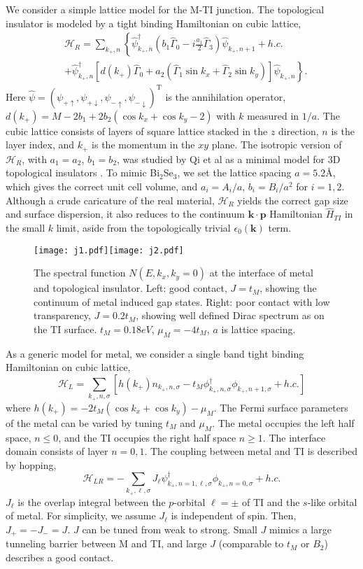 \documentclass[12pt,twocolumn]{article}
\def\v#1{\mathbf{#1}}
\newcommand{\kp}{k_{+}}
\begin{document}
We consider a simple lattice model for the M-TI junction.
The topological insulator is modeled by 
a tight binding Hamiltonian on cubic lattice,
\begin{eqnarray}
&\mathcal{H}_R=\sum_{\kp,n}\left\{ 
\hat{\psi}_{\kp,n}^\dagger (b_1\hat{\Gamma}_0-i\frac{a_1}{2}\hat{\Gamma}_3)  \hat{\psi}_{\kp,n+1}+ h.c. \right. \\
&+\left. 
\hat{\psi}_{\kp,n}^\dagger\left[d(\kp)\hat{\Gamma}_0+a_2(\hat{\Gamma}_1\sin k_x +\hat{\Gamma}_2\sin k_y)\right] \hat{\psi}_{\kp,n} \right\} .
\end{eqnarray}
Here $\hat{\psi}=(\psi_{+\uparrow},\psi_{+\downarrow},\psi_{-\uparrow},\psi_{-\downarrow})^\mathrm{T}$ is the annihilation operator, $d(\kp)=M-2b_1+2b_2(\cos k_x+\cos k_y-2)$ with $k$ measured in $1/a$. 
The cubic lattice consists of layers of square lattice stacked in the $z$ direction,
$n$ is the layer index, and $\kp$ is the momentum in the $xy$ plane.
The isotropic version of $\mathcal{H}_R$, with $a_1=a_2$, $b_1=b_2$, was 
studied by Qi et al as a minimal model for 3D topological insulators \cite{qi_field}.
To mimic Bi$_2$Se$_3$, we set the lattice spacing $a=5.2$\AA, which gives the correct unit cell volume, 
and $a_i=A_i/a$, $b_i=B_i/a^2$ for $i=1,2$. Although a crude caricature 
of the real material, $\mathcal{H}_R$ yields the correct gap size and surface dispersion, it also reduces to 
the continuum  $\mathbf{k\cdot p}$ Hamiltonian $\hat{H}_{TI}$ in the small $k$ limit, 
aside from the topologically trivial $\epsilon_0(\v{k})$ term.
 
\begin{figure}
\texttt{[image: j1.pdf]}\texttt{[image: j2.pdf]}
\caption{The spectral function $N(E,k_x,k_y=0)$ at the interface of metal and topological insulator. Left: 
good contact, $J=t_M$, showing the continuum of metal induced gap states. 
Right: poor contact with low transparency, $J=0.2t_M$, showing well 
defined Dirac spectrum as on the TI surface. $t_M=0.18eV$, $\mu_M=-4t_M$, $a$ is lattice spacing.}
\end{figure}
 
As a generic model for metal, we consider a single band tight binding Hamiltonian on cubic lattice,
\[
\mathcal{H}_L=\sum_{\kp,n,\sigma}[h({\kp})  n_{\kp,n,\sigma}
- t_M \phi_{\kp,n,\sigma}^\dagger  \phi_{\kp,n+1,\sigma} + h.c.] 
\]
where $h(\kp)=-2t_M(\cos k_x+\cos k_y)-\mu_M$. 
The Fermi surface parameters of the metal can be varied by tuning $t_M$ and $\mu_M$.
The metal occupies the left half space, $n\leq 0$, and 
the TI occupies the right half space $n\geq 1$. The interface domain consists of layer $n=0,1$. 
The coupling between metal and TI is described by hopping,
\[
\mathcal{H}_{LR}=-\sum_{\kp,\ell,\sigma}J_{\ell}\psi^{\dagger}_{\kp,n=1,\ell,\sigma}\phi_{\kp,n=0,\sigma}+h.c.
\]
$J_{\ell}$ is the overlap integral between the $p$-orbital $\ell=\pm$ of TI and the $s$-like orbital of metal. For simplicity, we assume $J_{\ell}$ is independent of spin. Then, $J_{+}=-J_{-}=J$. $J$ can be tuned from weak to strong. Small $J$ mimics a large tunneling barrier between M and TI, 
and large $J$ (comparable to $t_M$ or $B_2$) describes a good contact. 
\end{document}
